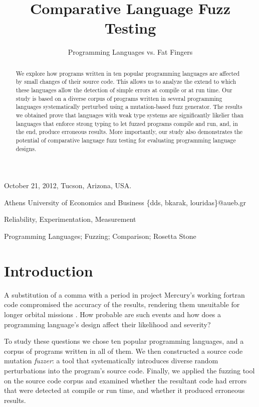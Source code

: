 \documentclass[10pt]{sigplanconf}
\begin{document}
 {October 21, 2012, Tucson, Arizona, USA.}

\title{Comparative Language Fuzz Testing}
\subtitle{Programming Languages vs. Fat Fingers}

  {Athens University of Economics and Business}
  {\{dds, bkarak, louridas\}@aueb.gr}

\maketitle

\begin{abstract}
We explore how programs written in ten popular programming languages
are affected by small changes of their source code.
This allows us to analyze the extend to which these languages
allow the detection of simple errors at compile or at run time.
Our study is based on a diverse corpus of programs written in several programming
languages systematically perturbed using a mutation-based fuzz generator.
The results we obtained
prove that languages with weak type systems are significantly
likelier than languages that enforce strong typing to let fuzzed programs
compile and run, and, in the end, produce erroneous results.
More importantly, our study also demonstrates the potential of comparative
language fuzz testing for evaluating programming language designs.
\end{abstract}


\terms
Reliability, Experimentation, Measurement

\keywords
Programming Languages; Fuzzing; Comparison; Rosetta Stone

\section{Introduction} %
\label{sec:intro}
A substitution of a comma with a period in project Mercury's working
{\sc fortran} code compromised the accuracy of the results,
rendering them unsuitable for longer orbital missions \cite{Brad89,Neu95}.
How probable are such events and how does a programming language's
design affect their likelihood and severity?

To study these questions we chose ten popular programming languages,
and a corpus of programs written in all of them.
We then constructed a source code mutation {\em fuzzer}:
a tool that systematically introduces diverse random perturbations
into the program's source code.
Finally, we applied the fuzzing tool on the source code corpus
and examined whether the resultant code had errors that
were detected at compile or run time, and whether it produced
erroneous results.
\end{document}
